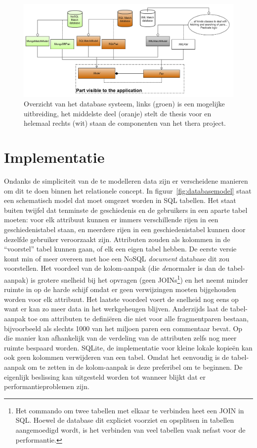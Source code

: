 \begin{figure}[ht]
	\begin{center}
		\includegraphics[width=1.0\columnwidth]{images/databaselayer.png}
		\caption{Overzicht van het database systeem, links (groen) is een mogelijke uitbreiding, het middelste deel (oranje) stelt de thesis voor en helemaal rechts (wit) staan de componenten van het thera project.}
		\label{fig:databaselayer}
	\end{center}
\end{figure}

\section{Implementatie}
Ondanks de simpliciteit van de te modelleren data zijn er verscheidene manieren om dit te doen binnen het relationele concept. In figuur~\ref{fig:databasemodel} staat een schematisch model dat moet omgezet worden in SQL tabellen. Het staat buiten twijfel dat tenminste de geschiedenis en de gebruikers in een aparte tabel moeten: voor elk attribuut kunnen er immers verschillende rijen in een geschiedenistabel staan, en meerdere rijen in een geschiedenistabel kunnen door dezelfde gebruiker veroorzaakt zijn. Attributen zouden als kolommen in de ``voorstel'' tabel kunnen gaan, of elk een eigen tabel hebben. De eerste versie komt min of meer overeen met hoe een NoSQL \emph{document} database dit zou voorstellen. Het voordeel van de kolom-aanpak (die \emph{de}normaler is dan de tabel-aanpak) is grotere snelheid bij het opvragen (geen JOINs\footnote{Het commando om twee tabellen met elkaar te verbinden heet een JOIN in SQL. Hoewel de database dit expliciet voorziet en opsplitsen in tabellen aangemoedigd wordt, is het verbinden van veel tabellen vaak nefast voor de performantie.}) en het neemt minder ruimte in op de harde schijf omdat er geen verwijzingen moeten bijgehouden worden voor elk attribuut. Het laatste voordeel voert de snelheid nog eens op want er kan zo meer data in het werkgeheugen blijven. Anderzijds laat de tabel-aanpak toe om attributen te defini\"eren die niet voor alle fragmentparen bestaan, bijvoorbeeld als slechts 1000 van het miljoen paren een commentaar bevat. Op die manier kan afhankelijk van de verdeling van de attributen zelfs nog meer ruimte bespaard worden. SQLite, de implementatie voor kleine lokale kopie\"en kan ook geen kolommen verwijderen van een tabel. Omdat het eenvoudig is de tabel-aanpak om te zetten in de kolom-aanpak is deze preferibel om te beginnen. De eigenlijk beslissing kan uitgesteld worden tot wanneer blijkt dat er performantieproblemen zijn.\\

